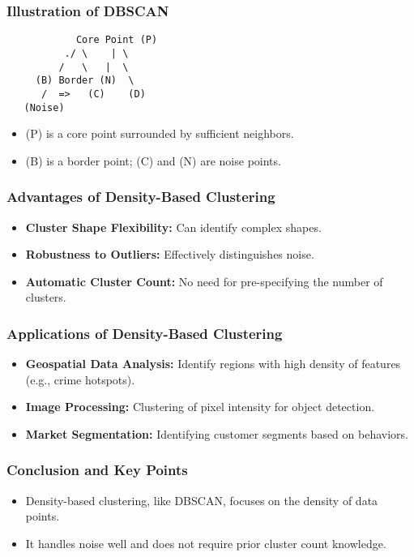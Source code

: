 \documentclass[aspectratio=169]{beamer}
\begin{document}
\begin{frame}[fragile]
    \frametitle{Illustration of DBSCAN}
    \begin{center}
        \begin{verbatim}
            Core Point (P)
          ./ \    | \  
         /   \   |  \
     (B) Border (N)  \
      /  =>   (C)    (D)
   (Noise)
        \end{verbatim}
    \end{center}
    \begin{itemize}
        \item (P) is a core point surrounded by sufficient neighbors.
        \item (B) is a border point; (C) and (N) are noise points.
    \end{itemize}
\end{frame}

\begin{frame}[fragile]
    \frametitle{Advantages of Density-Based Clustering}
    \begin{itemize}
        \item \textbf{Cluster Shape Flexibility:} Can identify complex shapes.
        \item \textbf{Robustness to Outliers:} Effectively distinguishes noise.
        \item \textbf{Automatic Cluster Count:} No need for pre-specifying the number of clusters.
    \end{itemize}
\end{frame}

\begin{frame}[fragile]
    \frametitle{Applications of Density-Based Clustering}
    \begin{itemize}
        \item \textbf{Geospatial Data Analysis:} Identify regions with high density of features (e.g., crime hotspots).
        \item \textbf{Image Processing:} Clustering of pixel intensity for object detection.
        \item \textbf{Market Segmentation:} Identifying customer segments based on behaviors.
    \end{itemize}
\end{frame}

\begin{frame}[fragile]
    \frametitle{Conclusion and Key Points}
    \begin{itemize}
        \item Density-based clustering, like DBSCAN, focuses on the density of data points.
        \item It handles noise well and does not require prior cluster count knowledge.
    \end{itemize}
\end{frame}
\end{document}
